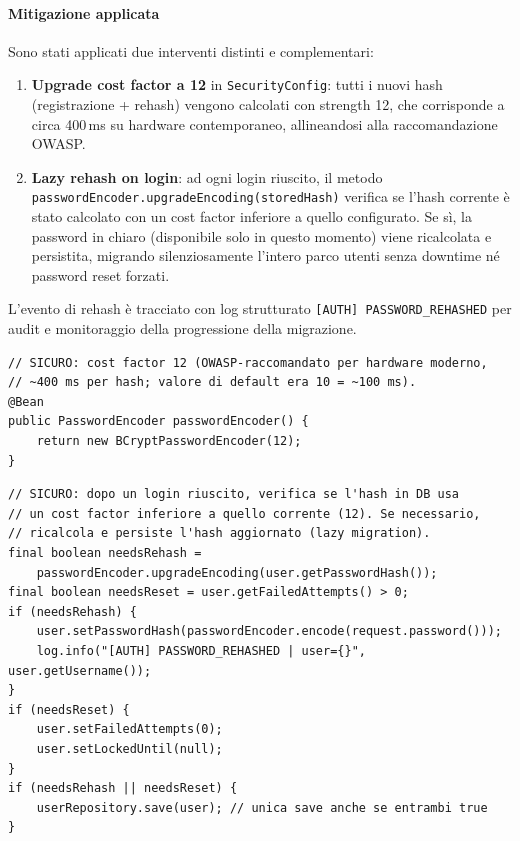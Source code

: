 ﻿\documentclass[a4paper,12pt]{report}
\begin{document}
\paragraph{Mitigazione applicata}
Sono stati applicati due interventi distinti e complementari:

\begin{enumerate}
  \item \textbf{Upgrade cost factor a 12} in \texttt{SecurityConfig}: tutti i nuovi hash
        (registrazione + rehash) vengono calcolati con strength 12, che corrisponde a circa
        400\,ms su hardware contemporaneo, allineandosi alla raccomandazione OWASP.
  \item \textbf{Lazy rehash on login}: ad ogni login riuscito, il metodo \\
        \texttt{passwordEncoder.upgradeEncoding(storedHash)} verifica se l'hash corrente
        è stato calcolato con un cost factor inferiore a quello configurato.
        Se sì, la password in chiaro (disponibile solo in questo momento) viene ricalcolata
        e persistita, migrando silenziosamente l'intero parco utenti senza downtime
        né password reset forzati.
\end{enumerate}

L'evento di rehash è tracciato con log strutturato \texttt{[AUTH] PASSWORD\_REHASHED}
per audit e monitoraggio della progressione della migrazione.

\begin{securebox}[title={Codice Sicuro --- SecurityConfig.java (cost factor 12)}]
\begin{lstlisting}[style=java]
// SICURO: cost factor 12 (OWASP-raccomandato per hardware moderno,
// ~400 ms per hash; valore di default era 10 = ~100 ms).
@Bean
public PasswordEncoder passwordEncoder() {
    return new BCryptPasswordEncoder(12);
}
\end{lstlisting}
\end{securebox}

\begin{securebox}[title={Codice Sicuro --- AuthServiceImpl.java (lazy rehash on login)}]
\begin{lstlisting}[style=java]
// SICURO: dopo un login riuscito, verifica se l'hash in DB usa
// un cost factor inferiore a quello corrente (12). Se necessario,
// ricalcola e persiste l'hash aggiornato (lazy migration).
final boolean needsRehash =
    passwordEncoder.upgradeEncoding(user.getPasswordHash());
final boolean needsReset = user.getFailedAttempts() > 0;
if (needsRehash) {
    user.setPasswordHash(passwordEncoder.encode(request.password()));
    log.info("[AUTH] PASSWORD_REHASHED | user={}", user.getUsername());
}
if (needsReset) {
    user.setFailedAttempts(0);
    user.setLockedUntil(null);
}
if (needsRehash || needsReset) {
    userRepository.save(user); // unica save anche se entrambi true
}
\end{lstlisting}
\end{securebox}
\end{document}
